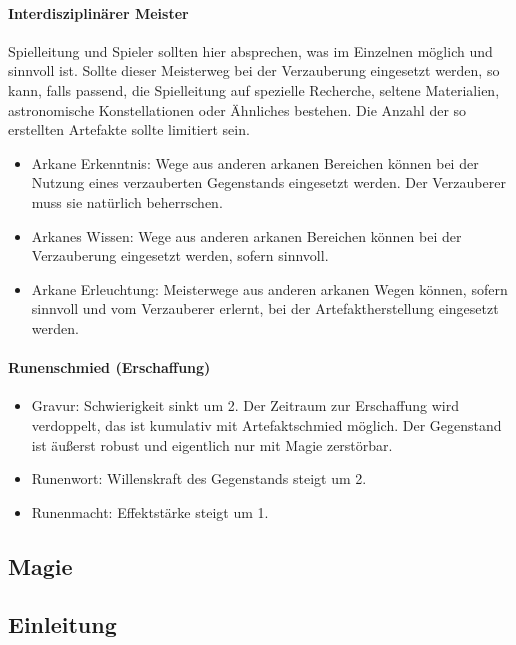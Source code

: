 \documentclass{article}
\begin{document}
\paragraph{Interdisziplinärer Meister}

Spielleitung und Spieler sollten hier absprechen, was im Einzelnen möglich und sinnvoll ist. Sollte dieser Meisterweg
bei der Verzauberung eingesetzt werden, so kann, falls passend, die Spielleitung auf spezielle Recherche, seltene
Materialien, astronomische Konstellationen oder Ähnliches bestehen. Die Anzahl der so erstellten Artefakte sollte
limitiert sein.

\begin{itemize}
\item Arkane Erkenntnis: Wege aus anderen arkanen Bereichen können bei der Nutzung eines verzauberten Gegenstands eingesetzt werden. Der Verzauberer muss sie natürlich beherrschen.
\item Arkanes Wissen: Wege aus anderen arkanen Bereichen können bei der Verzauberung eingesetzt werden, sofern sinnvoll.
\item Arkane Erleuchtung: Meisterwege aus anderen arkanen Wegen können, sofern sinnvoll und vom Verzauberer erlernt, bei der Artefaktherstellung eingesetzt werden.
\end{itemize}

\paragraph{Runenschmied (Erschaffung)}

\begin{itemize}
\item Gravur: Schwierigkeit sinkt um 2. Der Zeitraum zur Erschaffung wird verdoppelt, das ist kumulativ mit Artefaktschmied möglich. Der Gegenstand ist äußerst robust und eigentlich nur mit Magie zerstörbar.
\item Runenwort: Willenskraft des Gegenstands steigt um 2.
\item Runenmacht: Effektstärke steigt um 1.
\end{itemize}

\begin{center}
\section{Magie}
\end{center}

\begin{center}
\subsection{Einleitung}
\end{center}
\end{document}
